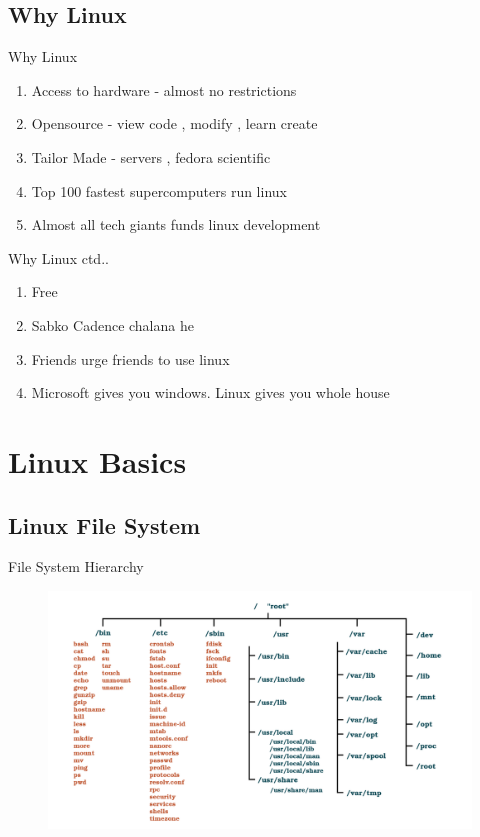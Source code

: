 \documentclass{beamer}
\begin{document}
\subsection{Why Linux}
\begin{frame}{Why Linux}
\begin{enumerate}
	\item<2-> Access to hardware - almost no restrictions
	\item<3-> Opensource - view code , modify , learn create
	\item<4-> Tailor Made - servers , fedora scientific
	\item<5-> Top 100 fastest supercomputers run linux 
	\item<6-> Almost all tech giants funds linux development
\end{enumerate}
\end{frame}
\begin{frame}{Why Linux ctd..}
\begin{enumerate}
	\item<2-> Free
	\item<3-> Sabko Cadence chalana he
	\item<4-> Friends urge friends to use linux 
	\item<5-> Microsoft gives you windows. Linux gives you whole house
\end{enumerate} 
\end{frame}
\section{Linux Basics}
\subsection{Linux File System}
{

	\begin{frame}{File System Hierarchy}
		\begin{figure}
			\includegraphics[width=0.9\paperwidth,height=0.8\paperheight]{./filesystem.pdf}
		\end{figure}
	\end{frame}
}
\end{document}

